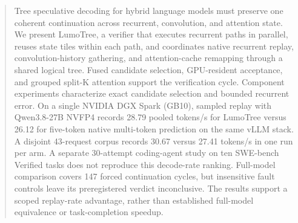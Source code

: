 \begin{abstract}
Tree speculative decoding for hybrid language models must preserve one coherent continuation across recurrent, convolution, and attention state. We present LumoTree, a verifier that executes recurrent paths in parallel, reuses state tiles within each path, and coordinates native recurrent replay, convolution-history gathering, and attention-cache remapping through a shared logical tree. Fused candidate selection, GPU-resident acceptance, and grouped split-K attention support the verification cycle. Component experiments characterize exact candidate selection and bounded recurrent error. On a single NVIDIA DGX Spark (GB10), sampled replay with Qwen3.8-27B NVFP4 records 28.79 pooled tokens/s for LumoTree versus 26.12 for five-token native multi-token prediction on the same vLLM stack. A disjoint 43-request corpus records 30.67 versus 27.41 tokens/s in one run per arm. A separate 30-attempt coding-agent study on ten SWE-bench Verified tasks does not reproduce this decode-rate ranking. Full-model comparison covers 147 forced continuation cycles, but insensitive fault controls leave its preregistered verdict inconclusive. The results support a scoped replay-rate advantage, rather than established full-model equivalence or task-completion speedup.
\end{abstract}
